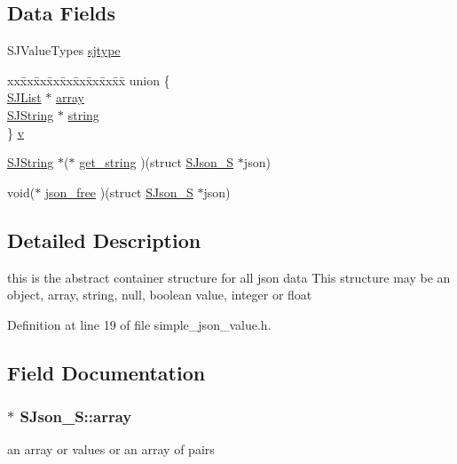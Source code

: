 \subsection*{Data Fields}
\begin{DoxyCompactItemize}
\item 
S\+J\+Value\+Types \hyperlink{structSJson__S_ad68edc13b2a814f9b920498ba439b8ba}{sjtype}
\item 
\begin{tabbing}
xx\=xx\=xx\=xx\=xx\=xx\=xx\=xx\=xx\=\kill
union \{\\
\>\hyperlink{structSJList}{SJList} $\ast$ \hyperlink{structSJson__S_aa8c595b7789550a64b08950b0ad88e1e}{array}\\
\>\hyperlink{structSJString}{SJString} $\ast$ \hyperlink{structSJson__S_ab50f7c395b214eb050ff59e3a9bbeb4a}{string}\\
\} \hyperlink{structSJson__S_a34c41be372d7bbe614b312cef2051b99}{v}\\

\end{tabbing}\item 
\hyperlink{structSJString}{S\+J\+String} $\ast$($\ast$ \hyperlink{structSJson__S_afd320740fab795e7063e89157a23c511}{get\+\_\+string} )(struct \hyperlink{structSJson__S}{S\+Json\+\_\+S} $\ast$json)
\item 
void($\ast$ \hyperlink{structSJson__S_a8bd24b6b85325a01b8bae6c5899583f2}{json\+\_\+free} )(struct \hyperlink{structSJson__S}{S\+Json\+\_\+S} $\ast$json)
\end{DoxyCompactItemize}


\subsection{Detailed Description}
this is the abstract container structure for all json data This structure may be an object, array, string, null, boolean value, integer or float 

Definition at line 19 of file simple\+\_\+json\+\_\+value.\+h.



\subsection{Field Documentation}
\subsubsection[{\texorpdfstring{array}{array}}]{$\ast$ S\+Json\+\_\+\+S\+::array}\hypertarget{structSJson__S_aa8c595b7789550a64b08950b0ad88e1e}{}\label{structSJson__S_aa8c595b7789550a64b08950b0ad88e1e}
an array or values or an array of pairs 

